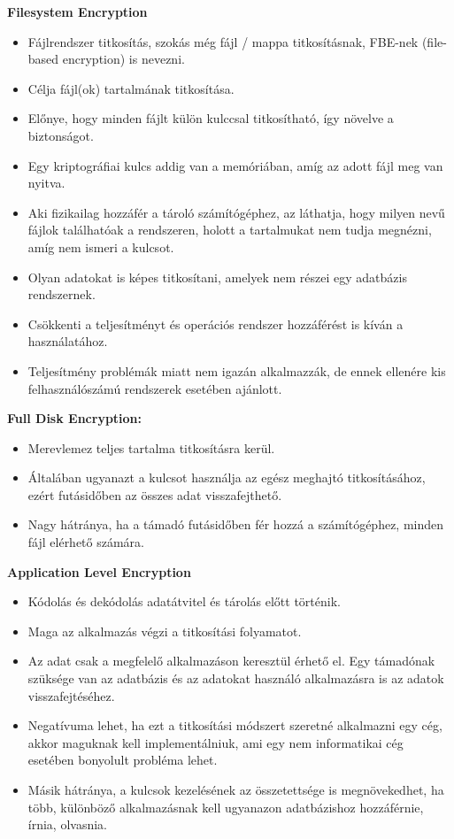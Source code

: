 
\noindent\textbf{Filesystem Encryption} \cite{enwiki:1020951139}
\begin{itemize}
	\item Fájlrendszer titkosítás, szokás még fájl / mappa titkosításnak, FBE-nek (file-based encryption) is nevezni.
	\item Célja fájl(ok) tartalmának titkosítása.
	\item Előnye, hogy minden fájlt külön kulccsal titkosítható, így növelve a biztonságot.
	\item Egy kriptográfiai kulcs addig van a memóriában, amíg az adott fájl meg van nyitva.
	\item Aki fizikailag hozzáfér a tároló számítógéphez, az láthatja, hogy milyen nevű fájlok találhatóak a rendszeren, holott a tartalmukat nem tudja megnézni, amíg nem ismeri a kulcsot.
	\item Olyan adatokat is képes titkosítani, amelyek nem részei egy adatbázis rendszernek.
	\item Csökkenti a teljesítményt és operációs rendszer hozzáférést is kíván a használatához.
	\item Teljesítmény problémák miatt nem igazán alkalmazzák, de ennek ellenére kis felhasználószámú rendszerek esetében ajánlott.
\end{itemize}

\bigskip

\noindent\textbf{Full Disk Encryption:} \cite{enwiki:1084723482}
\begin{itemize}
	\item Merevlemez teljes tartalma titkosításra kerül. 
	\item Általában ugyanazt a kulcsot használja az egész meghajtó titkosításához, ezért futásidőben az összes adat visszafejthető.
	\item Nagy hátránya, ha a támadó futásidőben fér hozzá a számítógéphez, minden fájl elérhető számára. 
\end{itemize}

\bigskip

\noindent\textbf{Application Level Encryption} \cite{saxena2015application}
\begin{itemize}
	\item Kódolás és dekódolás adatátvitel és tárolás előtt történik.
	\item Maga az alkalmazás végzi a titkosítási folyamatot.
	\item Az adat csak a megfelelő alkalmazáson keresztül érhető el. Egy támadónak szüksége van az adatbázis és az adatokat használó alkalmazásra is az adatok visszafejtéséhez.
	\item Negatívuma lehet, ha ezt a titkosítási módszert szeretné alkalmazni egy cég, akkor maguknak kell implementálniuk, ami egy nem informatikai cég esetében bonyolult probléma lehet.
	\item Másik hátránya, a kulcsok kezelésének az összetettsége is megnövekedhet, ha több, különböző alkalmazásnak kell ugyanazon adatbázishoz hozzáférnie, írnia, olvasnia.
\end{itemize}

